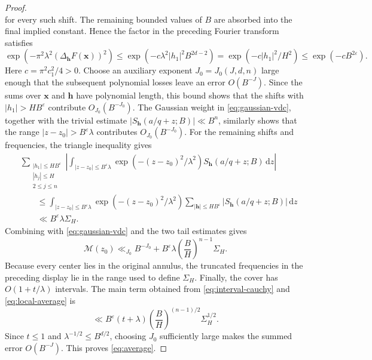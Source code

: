 \documentclass[10pt,a4paper]{amsart}
\newcommand{\dint}{\,\mathrm d}
\newcommand{\eps}{\varepsilon}
\newcommand{\h}{\mathbf h}
\newcommand{\x}{\mathbf{x}}
\begin{document}
\begin{proof}
\[\]
for every such shift.
The remaining bounded values of \(B\) are absorbed into the final implied constant.
Hence the factor in the preceding Fourier transform satisfies
\[
 \exp(-\pi^2\lambda^2(\Delta_\h F(\x))^2)
 \leq\exp(-c\lambda^2|h_1|^2B^{2d-2})
 =\exp(-c|h_1|^2/H^2)
 \leq\exp(-cB^{2\eps}).
\]
Here \(c=\pi^2c_1^2/4>0\).
Choose an auxiliary exponent \(J_0=J_0(J,d,n)\) large enough that the subsequent polynomial losses leave an error \(O(B^{-J})\).
Since the sums over \(\x\) and \(\h\) have polynomial length, this bound shows that the shifts with \(|h_1|>HB^\eps\) contribute \(O_{J_0}(B^{-J_0})\).
The Gaussian weight in \eqref{eq:gaussian-vdc}, together with the trivial estimate \(|S_{\h}(a/q+z;B)|\ll B^n\), similarly shows that the range \(|z-z_0|>B^\eps\lambda\) contributes \(O_{J_0}(B^{-J_0})\).
For the remaining shifts and frequencies, the triangle inequality gives
\begin{equation*}
 \begin{aligned}
 &\sum_{\substack{|h_1|\leq HB^\eps\\
                  |h_j|\leq H\\
                  2\leq j\leq n}}
 \left|\int_{|z-z_0|\leq B^\eps\lambda}
 \exp(-(z-z_0)^2/\lambda^2)
 S_{\h}(a/q+z;B)\dint z\right|\\
 &\qquad\leq
 \int_{|z-z_0|\leq B^\eps\lambda}
 \exp(-(z-z_0)^2/\lambda^2)
 \sum_{|\h|\leq HB^\eps}|S_{\h}(a/q+z;B)|\dint z\\
 &\qquad\ll B^\eps\lambda\Sigma_H.
 \end{aligned}
\end{equation*}
Combining with \eqref{eq:gaussian-vdc} and the two tail estimates gives
\begin{equation}\label{eq:local-average}
 \mathcal M(z_0)
 \ll_{J_0} B^{-J_0}
 +B^\eps\lambda\left(\frac BH\right)^{n-1}\Sigma_H.
\end{equation}
Because every center lies in the original annulus, the truncated frequencies in the preceding display lie in the range used to define \(\Sigma_H\).
Finally, the cover has \(O(1+t/\lambda)\) intervals.
The main term obtained from \eqref{eq:interval-cauchy} and \eqref{eq:local-average} is
\[
 \ll B^\eps(t+\lambda)
 \left(\frac BH\right)^{(n-1)/2}\Sigma_H^{1/2}.
\]
Since \(t\leq1\) and \(\lambda^{-1/2}\leq B^{d/2}\), choosing \(J_0\) sufficiently large makes the summed error \(O(B^{-J})\).
This proves \eqref{eq:average}.
\end{proof}
\end{document}
